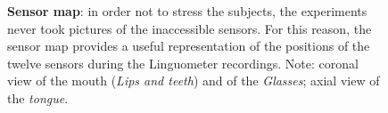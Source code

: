 \begin{figure}
	\centering
	\caption[Sensor map]{\textbf{Sensor map}:
	in order not to stress the subjects, the experiments never took pictures 
	of the inaccessible sensors. For this reason, the sensor map provides a
	useful representation of the positions of the twelve sensors during
	the Linguometer recordings.
	Note: coronal view of the mouth (\emph{Lips and teeth}) and of the
	\emph{Glasses}; axial view of the \emph{tongue}.}
	\label{fig:experiments:map}
\end{figure}
